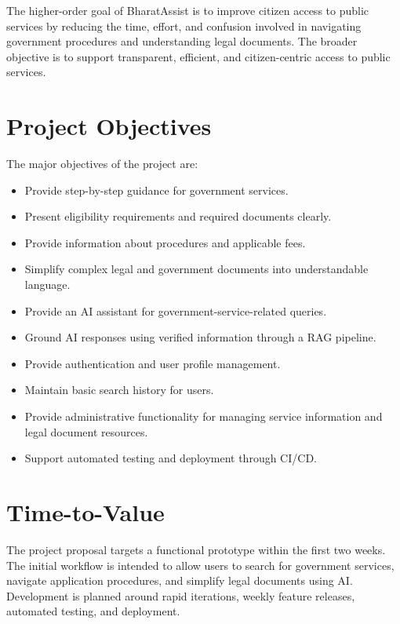 \documentclass[12pt,a4paper]{report}
\begin{document}
The higher-order goal of BharatAssist is to improve citizen access to public services by reducing the time, effort, and confusion involved in navigating government procedures and understanding legal documents. The broader objective is to support transparent, efficient, and citizen-centric access to public services.

\section{Project Objectives}

The major objectives of the project are:

\begin{itemize}[leftmargin=*]
    \item Provide step-by-step guidance for government services.
    \item Present eligibility requirements and required documents clearly.
    \item Provide information about procedures and applicable fees.
    \item Simplify complex legal and government documents into understandable language.
    \item Provide an AI assistant for government-service-related queries.
    \item Ground AI responses using verified information through a RAG pipeline.
    \item Provide authentication and user profile management.
    \item Maintain basic search history for users.
    \item Provide administrative functionality for managing service information and legal document resources.
    \item Support automated testing and deployment through CI/CD.
\end{itemize}

\section{Time-to-Value}

The project proposal targets a functional prototype within the first two weeks. The initial workflow is intended to allow users to search for government services, navigate application procedures, and simplify legal documents using AI. Development is planned around rapid iterations, weekly feature releases, automated testing, and deployment.

\end{document}
